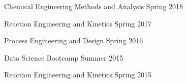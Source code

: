 
\begin{cventries}


  \cventrynew
	{Chemical Engineering Methods and Analysis}    
    {Spring 2018} 
    {}
    {}
    
  \cventrynew
	{Reaction Engineering and Kinetics}    
    {Spring 2017} 
    {}
    {}
    
  \cventrynew
	{Process Engineering and Design}    
    {Spring 2016} 
    {}
    {}
    
    
  \cventrynew
	{Data Science Bootcamp}    
    {Summer 2015} 
    {}
    {}
    
  \cventrynew
	{Reaction Engineering and Kinetics}    
    {Spring 2015} 
    {}
    {} 

\end{cventries}
